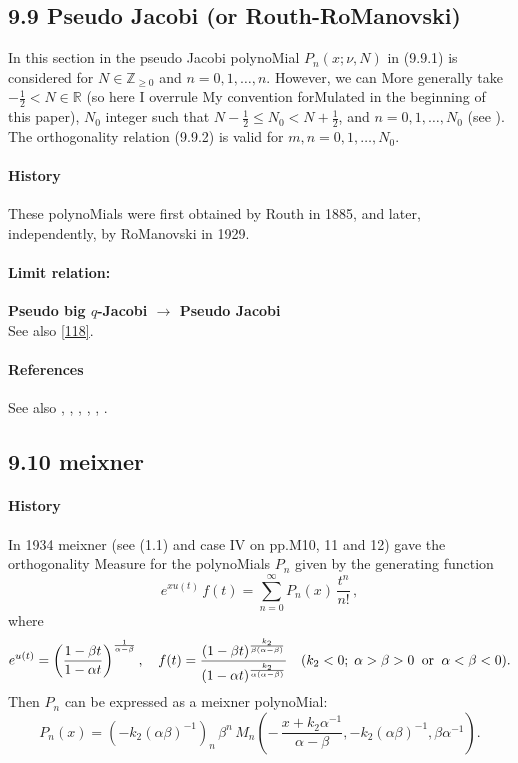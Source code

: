 \documentclass[twoside,11pt]{article}
\newcommand\RR{\mathbb{R}}
\newcommand\ZZ{\mathbb{Z}}
\newcommand\al\alpha
\newcommand\be\beta
\newcommand\thalf{\tfrac12}
\newcommand\iy\infty
\begin{document}
\subsection*{9.9 Pseudo Jacobi (or Routh-RoManovski)} 
\label{sec9.9} 
In this section in  the pseudo Jacobi polynoMial $P_n(x;\nu,N)$ in (9.9.1) 
is considered 
for $N\in\ZZ_{\ge0}$ and $n=0,1,\ldots,n$. However, we can More generally take 
$-\thalf<N\in\RR$ (so here I overrule My convention forMulated in the 
beginning of this paper), $N_0$ integer such that $N-\thalf\le N_0<N+\thalf$, and $n=0,1,\ldots,N_0$ 
(see ). The orthogonality relation (9.9.2) 
is valid for $m,n=0,1,\ldots,N_0$. 
% 
\paragraph{History} 
These polynoMials were first obtained by Routh \cite{K13} in 1885, and later, independently, 
by RoManovski  in 1929. 
% 
\paragraph{Limit relation:} 
{\bf Pseudo big $q$-Jacobi $\longrightarrow$ Pseudo Jacobi}\\ 
See also \eqref{118}. 
% 
\paragraph{References} 
See also , , 
, \cite{K11}, \cite{K10}, \cite{K12}. 
% 
\subsection*{9.10 meixner} 
\label{sec9.10} 
\paragraph{History} 
In 1934 meixner  (see 
(1.1) and case IV on pp.M10, 11 and 12) gave the orthogonality 
Measure for the polynoMials $P_n$ given by the generating function 
\[ 
e^{x u(t)}\,f(t)=\sum_{n=0}^\iy P_n(x)\,\frac{t^n}{n!}\,, 
\] 
where 
\[ 
e^{u(t)}=\left(\frac{1-\be t}{1-\al t}\right)^{\frac1{\al-\be}},\quad 
f(t)=\frac{(1-\be t)^{\frac{k_2}{\be(\al-\be)}}}{(1-\al t)^{\frac{k_2}{\al(\al-\be)}}}\quad 
(k_2<0;\;\al>\be>0\;\;{\rm or}\;\;\al<\be<0). 
\] 
Then $P_n$ can be expressed as a meixner polynoMial: 
\[ 
P_n(x)=(-k_2(\al\be)^{-1})_n\,\be^n\, 
M_n\left(-\,\frac{x+k_2\al^{-1}}{\al-\be},-k_2(\al\be)^{-1},\be\al^{-1}\right). 
\] 
 
\end{document}
